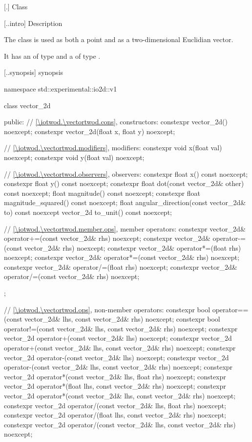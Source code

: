  [\iotwod.\vectortwod] {Class }

 [\iotwod.\vectortwod.intro] { Description}

%
\pnum
The class  is used as both a point and as a two-dimensional Euclidian vector.

\pnum
It has an  of type  and a  of type .

 [\iotwod.\vectortwod.synopsis] { synopsis}

\begin{codeblock}
namespace std::experimental::io2d::v1 {
  class vector_2d {
  public:
    // \ref{\iotwod.\vectortwod.cons}, constructors:
    constexpr vector_2d() noexcept;
    constexpr vector_2d(float x, float y) noexcept;

    // \ref{\iotwod.\vectortwod.modifiers}, modifiers:
    constexpr void x(float val) noexcept;
    constexpr void y(float val) noexcept;
    
    // \ref{\iotwod.\vectortwod.observers}, observers:
    constexpr float x() const noexcept;
    constexpr float y() const noexcept;
    constexpr float dot(const vector_2d& other) const noexcept;
    float magnitude() const noexcept;
    constexpr float magnitude_squared() const noexcept;
    float angular_direction(const vector_2d& to) const noexcept
    vector_2d to_unit() const noexcept;
    
    // \ref{\iotwod.\vectortwod.member.ops}, member operators:
    constexpr vector_2d& operator+=(const vector_2d& rhs) noexcept;
    constexpr vector_2d& operator-=(const vector_2d& rhs) noexcept;
    constexpr vector_2d& operator*=(float rhs) noexcept;
    constexpr vector_2d& operator*=(const vector_2d& rhs) noexcept;
    constexpr vector_2d& operator/=(float rhs) noexcept;
    constexpr vector_2d& operator/=(const vector_2d& rhs) noexcept;
  };
  
  // \ref{\iotwod.\vectortwod.ops}, non-member operators:
  constexpr bool operator==(const vector_2d& lhs, const vector_2d& rhs)
    noexcept;
  constexpr bool operator!=(const vector_2d& lhs, const vector_2d& rhs)
    noexcept;
  constexpr vector_2d operator+(const vector_2d& lhs) noexcept;
  constexpr vector_2d operator+(const vector_2d& lhs, const vector_2d& rhs)
    noexcept;
  constexpr vector_2d operator-(const vector_2d& lhs) noexcept;
  constexpr vector_2d operator-(const vector_2d& lhs, const vector_2d& rhs)
    noexcept;
  constexpr vector_2d operator*(const vector_2d& lhs, float rhs) noexcept;
  constexpr vector_2d operator*(float lhs, const vector_2d& rhs) noexcept;
  constexpr vector_2d operator*(const vector_2d& lhs, const vector_2d& rhs)
    noexcept;
  constexpr vector_2d operator/(const vector_2d& lhs, float rhs) noexcept;
  constexpr vector_2d operator/(float lhs, const vector_2d& rhs) noexcept;
  constexpr vector_2d operator/(const vector_2d& lhs, const vector_2d& rhs)
    noexcept;
}
\end{codeblock}

